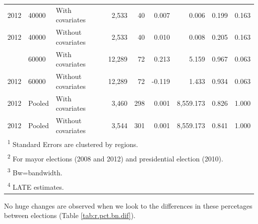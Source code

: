 \documentclass[12pt,]{article}
\begin{document}
\begin{table}[!h]
\begin{tabular}{lllrrrrrr}
2012 & 40000 & With covariates & 2,533 & 40 & 0.007 & 0.006 & 0.199 & 0.163\\
2012 & 40000 & Without covariates & 2,533 & 40 & 0.010 & 0.008 & 0.205 & 0.163\\
\addlinespace
2012 & 60000 & With covariates & 12,289 & 72 & 0.213 & 5.159 & 0.967 & 0.063\\
2012 & 60000 & Without covariates & 12,289 & 72 & -0.119 & 1.433 & 0.934 & 0.063\\
2012 & Pooled & With covariates & 3,460 & 298 & 0.001 & 8,559.173 & 0.826 & 1.000\\
2012 & Pooled & Without covariates & 3,544 & 301 & 0.001 & 8,559.173 & 0.841 & 1.000\\
\bottomrule
\multicolumn{9}{l}{\textsuperscript{1} Standard Errors are clustered by regions.}\\
\multicolumn{9}{l}{\textsuperscript{2} For mayor elections (2008 and 2012) and presidential election (2010).}\\
\multicolumn{9}{l}{\textsuperscript{3} Bw=bandwidth.}\\
\multicolumn{9}{l}{\textsuperscript{4} LATE estimates.}\\
\end{tabular}
\end{table}

No huge changes are observed when we look to the differences in these
percetages between elections (Table \ref{tab:r.pct.bn.dif}).
\end{document}
